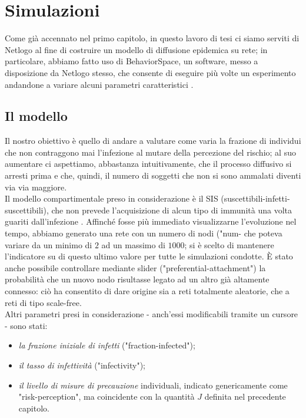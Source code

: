 \chapter{Simulazioni}
\label{chap:cap4}
Come già accennato nel primo capitolo, in questo lavoro di tesi ci siamo serviti di Netlogo al fine di costruire un modello di diffusione epidemica su rete; in particolare, abbiamo fatto uso di BehaviorSpace, un software, messo a disposizione da Netlogo stesso, che consente di eseguire più volte un esperimento andandone a variare alcuni parametri caratteristici \cite{Wilensky2}. 
\section{Il modello}
Il nostro obiettivo è quello di andare a valutare come varia la frazione di individui che non contraggono mai l'infezione al mutare della percezione del rischio; al suo aumentare ci aspettiamo, abbastanza intuitivamente, che il processo diffusivo si arresti prima e che, quindi, il numero di soggetti che non si sono ammalati diventi via via maggiore. \\Il modello compartimentale preso in considerazione è il SIS (suscettibili-infetti-suscettibili), che non prevede l'acquisizione di alcun tipo di immunità una volta guariti dall'infezione \cite{Brauer}. Affinché fosse più immediato visualizzarne l'evoluzione nel tempo, abbiamo generato una rete con un numero di nodi ("num- che poteva variare da un minimo di $ 2 $ ad un massimo di $ 1000 $; si è scelto di mantenere l'indicatore su di questo ultimo valore per tutte le simulazioni condotte. \`{E} stato anche possibile controllare mediante slider ("preferential-attachment") la probabilità che un nuovo nodo risultasse legato ad un altro già altamente connesso: ciò ha consentito di dare origine sia a reti totalmente aleatorie, che a reti di tipo scale-free. \\Altri parametri presi in considerazione - anch'essi modificabili tramite un cursore - sono stati:
\begin{itemize}
\item \textit{la frazione iniziale di infetti} ("fraction-infected");
\item \textit{il tasso di infettività} ("infectivity");
\item \textit{il livello di misure di precauzione} individuali, indicato genericamente come "risk-perception", ma coincidente con la quantità $ J $ definita nel precedente capitolo.
\end{itemize}
